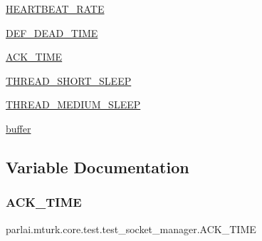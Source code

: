 \begin{DoxyCompactItemize}
\item 
\hyperlink{namespaceparlai_1_1mturk_1_1core_1_1test_1_1test__socket__manager_a372be4fd75c100f0615d8fa903460e9a}{H\+E\+A\+R\+T\+B\+E\+A\+T\+\_\+\+R\+A\+TE}
\item 
\hyperlink{namespaceparlai_1_1mturk_1_1core_1_1test_1_1test__socket__manager_a39be55edb7de390010383fd9f9432128}{D\+E\+F\+\_\+\+D\+E\+A\+D\+\_\+\+T\+I\+ME}
\item 
\hyperlink{namespaceparlai_1_1mturk_1_1core_1_1test_1_1test__socket__manager_acd23c63a260d75cb43eb9645dcafb0f1}{A\+C\+K\+\_\+\+T\+I\+ME}
\item 
\hyperlink{namespaceparlai_1_1mturk_1_1core_1_1test_1_1test__socket__manager_a48b372b1a564517fe6a2e83012246d7e}{T\+H\+R\+E\+A\+D\+\_\+\+S\+H\+O\+R\+T\+\_\+\+S\+L\+E\+EP}
\item 
\hyperlink{namespaceparlai_1_1mturk_1_1core_1_1test_1_1test__socket__manager_ae646d9eecf760c5bbe0ed6b1a92b32b7}{T\+H\+R\+E\+A\+D\+\_\+\+M\+E\+D\+I\+U\+M\+\_\+\+S\+L\+E\+EP}
\item 
\hyperlink{namespaceparlai_1_1mturk_1_1core_1_1test_1_1test__socket__manager_aada2ea82bdb7a2000aa00b33e5925794}{buffer}
\end{DoxyCompactItemize}


\subsection{Variable Documentation}
\mbox{\label{namespaceparlai_1_1mturk_1_1core_1_1test_1_1test__socket__manager_acd23c63a260d75cb43eb9645dcafb0f1}} 
\subsubsection{\texorpdfstring{A\+C\+K\+\_\+\+T\+I\+ME}{ACK\_TIME}}
{\footnotesize\ttfamily parlai.\+mturk.\+core.\+test.\+test\+\_\+socket\+\_\+manager.\+A\+C\+K\+\_\+\+T\+I\+ME}

\mbox{\label{namespaceparlai_1_1mturk_1_1core_1_1test_1_1test__socket__manager_ad1cc6de33a0ac59ecef6d5c5cc76cf90}} 
